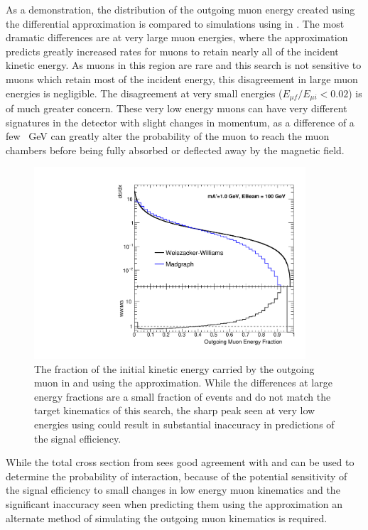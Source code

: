As a demonstration, the distribution of the outgoing muon energy created using the differential \ww approximation is compared to simulations using \mg in . 
The most dramatic differences are at very large muon energies, where the \ww approximation predicts greatly increased rates for muons to retain nearly all of the incident kinetic energy.
As muons in this region are rare and this search is not sensitive to muons which retain most of the incident energy, this disagreement in large muon energies is negligible.
The disagreement at very small energies ($E_{\mu f}/E_{\mu i}<0.02$) is of much greater concern. 
These very low energy muons can have very different signatures in the detector with slight changes in momentum, as a difference of a few \SI{}{\giga\eV} can greatly alter the probability of the muon to reach the muon chambers before being fully absorbed or deflected away by the magnetic field.

\begin{figure}[htbp]
	\includegraphics[width=0.9\textwidth]{figures/wwXcomp.pdf}
	\caption[\ww and \mg Outgoing Energy]{The fraction of the initial kinetic energy carried by the outgoing muon in \mg and using the \ww approximation. While the differences at large energy fractions are a small fraction of events and do not match the target kinematics of this search, the sharp peak seen at very low energies using \ww could result in substantial inaccuracy in predictions of the signal efficiency.}
	\label{fig:wwMgComp}
\end{figure}

While the total cross section from \ww sees good agreement with \mg and can be used to determine the probability of interaction, because of the potential sensitivity of the signal efficiency to small changes in low energy muon kinematics and the significant inaccuracy seen when predicting them using the \ww approximation an alternate method of simulating the outgoing muon kinematics is required.

